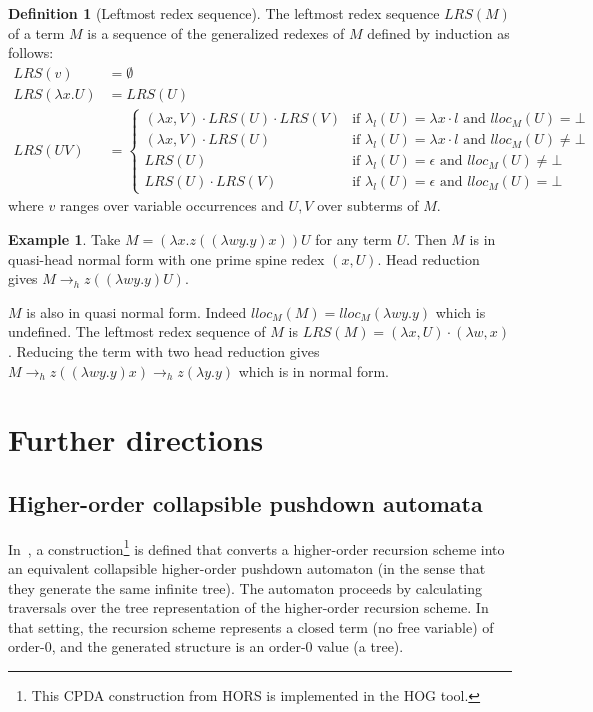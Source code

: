 \documentclass{article}
\theoremstyle{plain}
\theoremstyle{definition}
\newtheorem{definition}{Definition}[section]
\newtheorem{example}{Example}[section]
\theoremstyle{remark}
\begin{document}
\begin{definition}[Leftmost redex sequence]
The leftmost redex sequence $LRS(M)$ of a term $M$ is a sequence of the generalized redexes of $M$ defined by induction as follows:
\begin{align*}
LRS(v) &= \emptyset \\
LRS(\lambda x . U) &= LRS(U)\\
LRS(U V) &=
    \begin{cases}
        (\lambda x, V) \cdot LRS(U) \cdot LRS(V) & \mbox{if $\lambda_l(U) = \lambda x \cdot l$ and $lloc_M(U) =\bot$ } \\
        (\lambda x, V) \cdot  LRS(U) & \mbox{if $\lambda_l(U) = \lambda x \cdot l $ and $lloc_M(U) \neq \bot$} \\
        LRS(U) & \mbox{if $\lambda_l(U) = \epsilon$ and $lloc_M(U) \neq \bot$} \\
        LRS(U) \cdot LRS(V) & \mbox{if $\lambda_l(U) = \epsilon$ and $lloc_M(U) = \bot$}
    \end{cases}
\end{align*}
where $v$ ranges over variable occurrences and $U,V$ over subterms of $M$.
\end{definition}

\begin{example}
Take $M = (\lambda x . z ((\lambda w y . y)x)) U$ for any term $U$.
Then $M$ is in quasi-head normal form with one prime spine redex $(x,U)$.
Head reduction gives $M \rightarrow_h z ((\lambda w y. y) U)$.

$M$ is also in quasi normal form. Indeed $lloc_M(M) = lloc_M (\lambda w y . y)$ which is undefined.
The leftmost redex sequence of $M$ is $LRS(M) = (\lambda x, U) \cdot (\lambda w, x)$.
Reducing the term with two head reduction gives
$M \rightarrow_h z ((\lambda w y.y)x) \rightarrow_h z (\lambda y . y)$ which is in normal form.
\end{example}



\section{Further directions}

\subsection{Higher-order collapsible pushdown automata}

In~\cite{Ong2006}, a construction\footnote{This CPDA construction from HORS is implemented in the HOG tool.}
 is defined that converts a higher-order recursion scheme into an equivalent collapsible higher-order pushdown automaton (in the sense that they generate the same infinite tree). The automaton proceeds by calculating traversals over the tree representation of the higher-order recursion scheme. In that setting, the recursion scheme represents a closed term (no free variable) of order-$0$, and the generated structure is an order-$0$ value (a tree).
\end{document}
